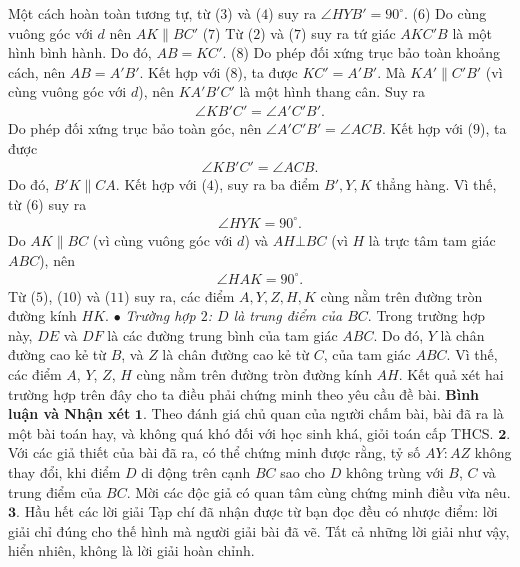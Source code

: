 \begin{multicols}{2}
	\vskip 0.05cm
	Một cách hoàn toàn tương tự, từ ($3$) và ($4$) suy ra  $\angle HYB' = 90^\circ$. \hfill  ($6$)
	\vskip 0.05cm
	Do cùng vuông góc với $d$ nên $AK \parallel BC'$ \hfill ($7$)
	\vskip 0.05cm
	Từ ($2$) và ($7$) suy ra tứ giác $AKC'B$ là một hình bình hành. Do  đó, $AB = KC'$. \hfill ($8$)
	\vskip 0.05cm
	Do phép đối xứng trục bảo toàn khoảng cách, nên $AB = A'B'$.  Kết hợp với ($8$), ta được $KC' = A'B'$. Mà  $KA' \parallel C'B'$ (vì cùng vuông góc với $d$), nên $KA'B'C'$  là một hình thang cân. Suy ra
	\begin{align*}
		\angle KB'C' = \angle A'C'B'. \tag{$9$}
	\end{align*}
	Do phép đối xứng trục bảo toàn góc, nên $\angle A'C'B' = \angle ACB.$   Kết hợp với ($9$), ta được
	\begin{align*}
		\angle KB'C' = \angle ACB.	
	\end{align*}
	Do đó, $B'K \parallel CA$. Kết hợp với ($4$), suy ra ba điểm  $B', Y, K$ thẳng hàng. Vì thế, từ ($6$) suy ra
	\begin{align*}
		\angle HYK = {90^\circ}. \tag{$10$}
	\end{align*}
	Do $AK \parallel BC$  (vì cùng vuông góc với $d$) và $AH \bot BC$ (vì $H$ là trực tâm tam giác $ABC$), nên
	\begin{align*}
		\angle HAK = 90^\circ. \tag{$11$}
	\end{align*}
	Từ ($5$), ($10$) và ($11$) suy ra, các điểm $A, Y, Z, H, K$ cùng nằm trên đường tròn đường kính $HK$.
	\vskip 0.05cm
	$\bullet$ \textit{Trường hợp $2$: $D$ là trung điểm của $BC$}.
	\vskip 0.05cm
	Trong trường hợp này, $DE$ và $DF$ là các đường trung bình của tam giác $ABC$. Do đó, $Y$ là chân đường cao kẻ từ $B$, và $Z$ là chân đường cao kẻ từ $C$, của tam giác $ABC$. Vì thế, các điểm $A$, $Y$, $Z$, $H$ cùng nằm trên đường tròn đường kính $AH$.
	\vskip 0.05cm
	Kết quả xét hai trường hợp trên đây cho ta điều phải chứng minh theo yêu cầu đề bài.
	\vskip 0.05cm
	\textbf{\color{thachthuctoanhoc}Bình luận và Nhận xét}
	\vskip 0.05cm
	$\pmb{1.}$ Theo đánh giá chủ quan của người chấm bài, bài đã ra là một bài toán hay, và không quá khó đối với học sinh khá, giỏi toán cấp THCS.
	\vskip 0.05cm
	$\pmb{2.}$ Với các giả thiết của bài đã ra, có thể chứng minh được rằng, tỷ số $AY : AZ$  không thay đổi, khi điểm $D$ di động trên cạnh $BC$ sao cho $D$ không trùng với $B$, $C$ và trung điểm của $BC$. Mời các độc giả có quan tâm cùng chứng minh điều vừa nêu.
	\vskip 0.05cm
	$\pmb{3.}$ Hầu hết các lời giải Tạp chí đã nhận được từ bạn đọc đều có nhược điểm: lời giải chỉ đúng cho thế hình mà người giải bài đã vẽ. Tất cả những lời giải như vậy, hiển nhiên, không là lời giải hoàn chỉnh.

\end{multicols}
